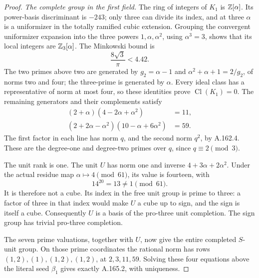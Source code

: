 \begin{proof}
\emph{The complete group in the first field.}
The ring of integers of \(K_1\) is \(\mathbb Z[\alpha]\).
Its power-basis discriminant is \(-243\); only three can divide its
index, and at three \(\alpha\) is a uniformizer in the totally ramified
cubic extension.  Grouping the convergent uniformizer expansion into
the three powers \(1,\alpha,\alpha^2\), using \(\alpha^3=3\), shows
that its local integers are \(\mathbb Z_3[\alpha]\).
The Minkowski bound is
\[
                 \frac{8\sqrt3}{\pi}<4.42 .
\tag{A.165.7}
\]
The two primes above two are generated by
\(g_2=\alpha-1\) and \(\alpha^2+\alpha+1=2/g_2\), of norms two and four;
the three-prime is generated by \(\alpha\).
Every ideal class has a representative of norm at most four, so these
identities prove \(\operatorname{Cl}(K_1)=0\).
The remaining generators and their complements satisfy
\[
\begin{aligned}
 (2+\alpha)(4-2\alpha+\alpha^2)&=11,\\
 (2+2\alpha-\alpha^2)(10-\alpha+6\alpha^2)&=59 .
\end{aligned}
\tag{A.165.8}
\]
The first factor in each line has norm \(q\), and the second norm
\(q^2\), by A.162.4.  These are the degree-one and degree-two primes
over \(q\), since \(q\equiv2\pmod3\).

The unit rank is one.  The unit \(U\) has norm one and inverse
\(4+3\alpha+2\alpha^2\).  Under the actual residue map
\(\alpha\mapsto4\pmod{61}\), its value is fourteen, with
\[
                    14^{20}=13\ne1\pmod{61}.
\tag{A.165.9}
\]
It is therefore not a cube.  Its index in the free unit group is prime
to three: a factor of three in that index would make \(U\) a cube
up to sign, and the sign is itself a cube.
Consequently \(U\) is a basis of the pro-three unit completion.
The sign group has trivial pro-three completion.

The seven prime valuations, together with \(U\), now give the entire
completed \(S\)-unit group.  On those prime coordinates the rational
norm has rows \((1,2),(1),(1,2),(1,2)\), at \(2,3,11,59\).
Solving these four equations above the literal seed \(\beta_1\)
gives exactly A.165.2, with uniqueness.


\end{proof}
